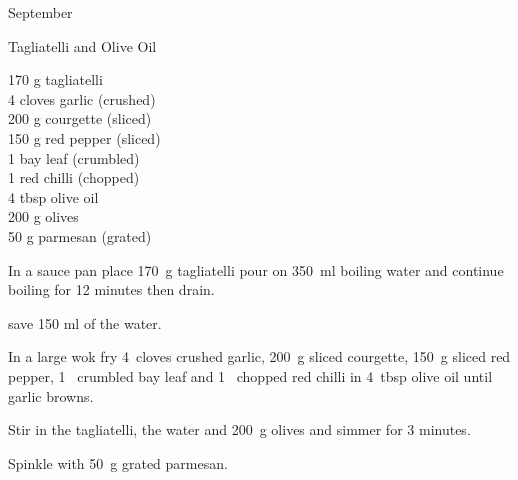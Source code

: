 \begin{menu}{September}
    \begin{recipe}{1}{Tagliatelli and Olive Oil}%
		\begin{ingredients}
		170 g tagliatelli  \\
	4 cloves garlic (crushed) \\
	200 g courgette (sliced) \\
	150 g red pepper (sliced) \\
	1  bay leaf (crumbled) \\
	1  red chilli (chopped) \\
	4 tbsp olive oil  \\
	200 g olives  \\
	50 g parmesan (grated) \\
	
		\end{ingredients}
	
	
    \begin{instructions}
    \item 
    In a
    sauce pan
    place
    170~g  tagliatelli
    pour on
    350~ml  boiling water and continue boiling for 12 minutes then drain.
  
        save 150 ml of the water.
      \item 
        In a large wok fry
        4~cloves crushed garlic,
        200~g sliced courgette,
        150~g sliced red pepper,
        1~ crumbled bay leaf
        and
        1~ chopped red chilli
        in
        4~tbsp  olive oil
        until garlic browns.
      \item 
        Stir in the tagliatelli,
        the water
        and
        200~g  olives
        and simmer for 3 minutes.
      \item 
        Spinkle with
        50~g grated parmesan.
      
    \end{instructions}
    \end{recipe}%
  
    \clearpage
    \end{menu}
	
